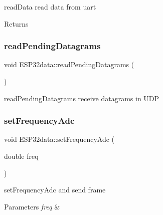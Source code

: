 read\+Data read data from uart 

\begin{DoxyReturn}{Returns}

\end{DoxyReturn}
\mbox{\label{class_e_s_p32data_ab474f90be7784fdc763e78d6bb741c91}} 
\subsubsection{\texorpdfstring{read\+Pending\+Datagrams}{readPendingDatagrams}}
{\footnotesize\ttfamily void E\+S\+P32data\+::read\+Pending\+Datagrams (\begin{DoxyParamCaption}{ }\end{DoxyParamCaption})\hspace{0.3cm}{\ttfamily [slot]}}



read\+Pending\+Datagrams receive datagrams in U\+DP 

\mbox{\label{class_e_s_p32data_aa2716175de492c5de8bb48333eafd9a2}} 
\subsubsection{\texorpdfstring{set\+Frequency\+Adc}{setFrequencyAdc}}
{\footnotesize\ttfamily void E\+S\+P32data\+::set\+Frequency\+Adc (\begin{DoxyParamCaption}\item[{double}]{freq }\end{DoxyParamCaption})\hspace{0.3cm}{\ttfamily [slot]}}



set\+Frequency\+Adc and send frame 


\begin{DoxyParams}{Parameters}
{\em freq} & \\
\hline
\end{DoxyParams}
\mbox{\label{class_e_s_p32data_ad2205a1545fbea3bff74848dc43c4684}} 
